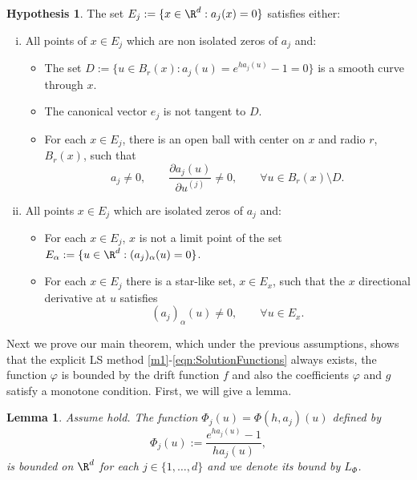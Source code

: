 \documentclass[sort&compress, preprint]{elsarticle}
\theoremstyle{definition}
\newtheorem{hypothesis}{Hypothesis}[section]
\theoremstyle{plain}%
\newtheorem{lem}{Lemma}[section]
\theoremstyle{remark}
\begin{document}
\begin{hypothesis}\label{ass:HypThmSingularities}
	The set $E_j:=\{x\in \R^{d}: a_j(x)=0\}$ satisfies either:
	\begin{enumerate}[(i)]
		\item  All points of  $ x\in E_j$  which are non isolated zeros of $a_j$ and:
			\begin{itemize}
				\item The set $D:=\{u \in B_r(x): a_j(u)=e^{ha_j(u)}-1= 0\}$ 
					is a smooth curve through $x$. 
				\item
					The canonical vector $e_j$ is not
					tangent to $D$.
				\item
					For each $x \in E_j$, there is an open ball with center
					on $x$ and radio $r$, $B_r(x)$, such that  
					$$
						a_j\neq 0, \qquad
						\frac{\partial a_j(u)}{\partial u^{(j)}} \neq 0 ,\qquad 
						\forall u \in B_r(x)
						\setminus D.
					$$	
			\end{itemize}	
		\item
			All points $x \in E_j$ which are isolated zeros of $a_j$ and:
			\begin{itemize}
				\item
					For each $x\in E_j$,  $x$ is not a limit point of the set 
					$E_{\alpha}:=\{u \in \R^d: (a_j)_\alpha(u)=0\}$.
				\item
					For each $x \in E_j$ there is a star-like set, $x\in E_x$, such that
					the $x$ directional derivative at $u$ satisfies
					$$
						 (a_j)_\alpha(u) \neq 0, \qquad \forall u\in E_x.
					$$
			\end{itemize}		
	\end{enumerate}	
\end{hypothesis}
Next we prove our main theorem, which under the previous assumptions, shows that
the explicit LS method  \eqref{m1}-\eqref{eqn:SolutionFunctions} always exists, 
the function $\varphi$ is bounded by the drift function $f$ and also
the coefficients $\varphi$ and $g$ satisfy a monotone condition. First, we will give a lemma.
\begin{lem}\label{l1}
 Assume  hold. The function $\Phi_j(u)=\Phi(h, a_j)(u)$ 
 defined by
 \begin{equation}\label{eqn:ExpBound}
		\Phi_j(u):=\frac{e^{ha_j(u)}-1}{ha_j(u)},
	\end{equation}
	is bounded  on $\R^d$ for each $j\in \{ 1,\dots, d\}$ 
	and we denote its bound by $L_{\Phi}$.
\end{lem}
\end{document}
